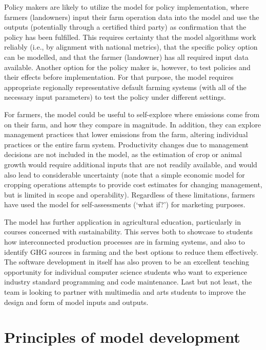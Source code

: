 Policy makers are likely to utilize the model for policy implementation, where
farmers (landowners) input their farm operation data into the model and use the
outputs (potentially through a certified third party) as confirmation that the
policy has been fulfilled. This requires certainty that the model algorithms
work reliably (i.e., by alignment with national metrics), that the specific
policy option can be modelled, and that the farmer (landowner) has all required
input data available. Another option for the policy maker is, however, to test
policies and their effects before implementation. For that purpose, the model
requires appropriate regionally representative default farming systems (with all
of the necessary input parameters) to test the policy under different settings.

For farmers, the model could be useful to self-explore where emissions come from
on their farm, and how they compare in magnitude. In addition, they can explore
management practices that lower emissions from the farm, altering individual
practices or the entire farm system. Productivity changes due to management
decisions are not included in the model, as the estimation of crop or animal
growth would require additional inputs that are not readily available, and would
also lead to considerable uncertainty (note that a simple economic model for
cropping operations attempts to provide cost estimates for changing management,
but is limited in scope and operability). Regardless of these limitations,
farmers have used the model for self-assessments (`what if?') for marketing
purposes.

The model has further application in agricultural education, particularly in
courses concerned with sustainability. This serves both to showcase to students
how interconnected production processes are in farming systems, and also to
identify GHG sources in farming and the best options to reduce them effectively.
The software development in itself has also proven to be an excellent teaching
opportunity for individual computer science students who want to experience
industry standard programming and code maintenance. Last but not least, the team
is looking to partner with multimedia and arts students to improve the design
and form of model inputs and outputs.

\section{Principles of model development}
\label{sec:principles}

